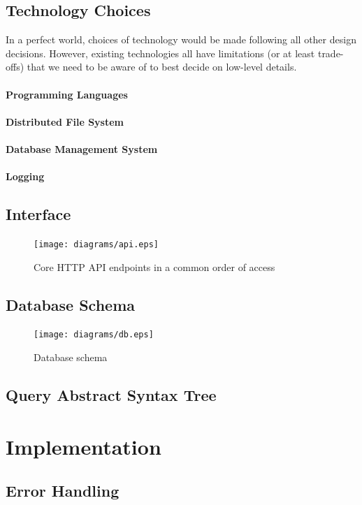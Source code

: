 \documentclass[a4paper,oneside,12pt]{book}
\begin{document}
\subsection{Technology Choices}
In a perfect world, choices of technology would be made following
all other design decisions.  However, existing technologies all have
limitations (or at least trade-offs) that we need to be aware of to best
decide on low-level details.

\paragraph{Programming Languages}
\paragraph{Distributed File System}
\paragraph{Database Management System}
\paragraph{Logging}

\subsection{Interface}
\begin{figure}
  \texttt{[image: diagrams/api.eps]}
  \caption{Core HTTP API endpoints in a common order of access}
  \label{api}
\end{figure}

\subsection{Database Schema}
\begin{figure}
  \texttt{[image: diagrams/db.eps]}
  \caption{Database schema}
  \label{db}
\end{figure}

\subsection{Query Abstract Syntax Tree}

\section{Implementation}
\subsection{Error Handling}
\end{document}
